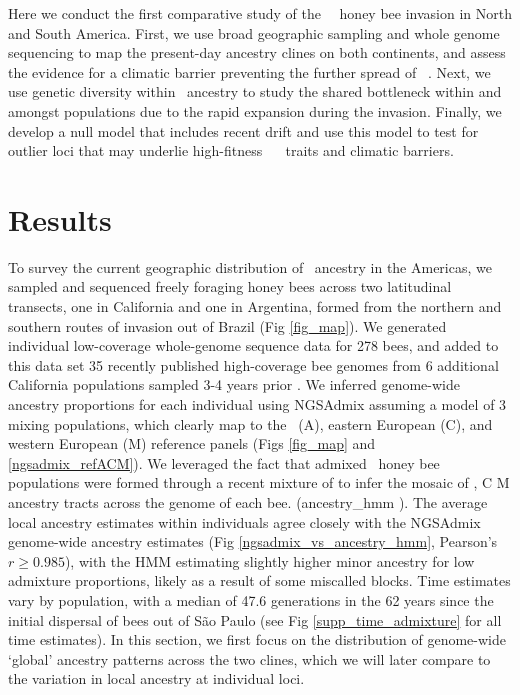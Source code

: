Here we conduct the first comparative study of the \africanized\ \hyb\ honey bee invasion in North and South America. First, we use broad geographic sampling and whole genome sequencing to map the present-day ancestry clines on both continents, and assess the evidence for a climatic barrier preventing the further spread of \scutellata\ \anc. Next, we use genetic diversity within \scutellata\ ancestry to study the shared bottleneck within and amongst populations due to the rapid expansion during the invasion. Finally, we develop a null model that includes recent drift and use this model to test for outlier loci that may underlie high-fitness \africanized\ \hyb\  traits and climatic barriers.

\section*{Results}

To survey the current geographic distribution of \scutellata\ ancestry in the Americas, we sampled and sequenced freely foraging honey bees across two latitudinal transects, one in California and one in Argentina, formed from the northern and southern routes of invasion out of Brazil (Fig \ref{fig_map}). We generated individual low-coverage whole-genome sequence data for 278 bees, and added to this data set 35 recently published high-coverage bee genomes from 6 additional California populations sampled 3-4 years prior \cite{Cridland:2018fx}. We inferred genome-wide ancestry proportions for each individual using NGSAdmix \cite{Skotte:2013_NGSadmix} assuming a model of 3 mixing populations, which clearly map to the \scutellata\ (A), eastern European (C), and western European (M) reference panels (Figs \ref{fig_map} and \ref{ngsadmix_refACM}). We leveraged the fact that admixed \africanized\ honey bee populations were formed through a recent mixture of  to infer the mosaic of \A, C  M ancestry tracts across the genome of each bee.  (ancestry\_hmm \cite{CorbettDetig:2017gh}). The average local ancestry estimates within individuals agree closely with the NGSAdmix genome-wide ancestry estimates (Fig \ref{ngsadmix_vs_ancestry_hmm}, Pearson's $r \geq 0.985$), with the HMM estimating slightly higher minor ancestry for low admixture proportions, likely as a result of some miscalled blocks. Time estimates vary by population, with a median of 47.6 generations in the 62 years since the initial dispersal of  bees out of São Paulo (see Fig \ref{supp_time_admixture} for all time estimates). In this section, we first focus on the distribution of genome-wide ‘global' ancestry patterns across the two clines, which we will later compare to the variation in local ancestry at individual loci.

